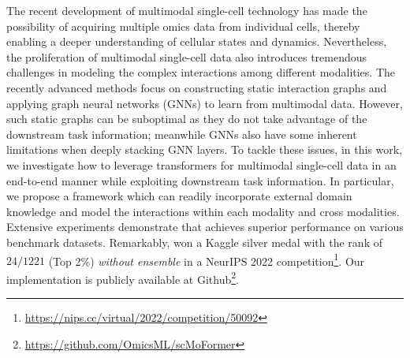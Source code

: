 The recent development of multimodal single-cell technology has made the possibility of acquiring multiple omics data from individual cells, thereby enabling a deeper understanding of cellular states and dynamics. 
Nevertheless, the proliferation of multimodal single-cell data also introduces tremendous challenges in modeling the complex interactions among different modalities. The recently advanced methods focus on constructing static interaction graphs and applying graph neural networks (GNNs) to learn from multimodal data. However, such static graphs can be suboptimal as they do not take advantage of the downstream task information; meanwhile GNNs also have some inherent limitations when deeply stacking GNN layers. To tackle these issues, in this work, we investigate how to leverage transformers for multimodal single-cell data in an end-to-end manner while exploiting downstream task information. In particular, we propose a \method{} framework which can readily incorporate external domain knowledge and model the interactions within each modality and cross modalities.
Extensive experiments demonstrate that \method{} achieves superior performance on various benchmark datasets. Remarkably, \method{} won a Kaggle silver medal with the rank of $24 / 1221$ (Top 2\%) {\it without ensemble} in a NeurIPS 2022 competition\footnote{\url{https://nips.cc/virtual/2022/competition/50092}}. Our implementation is publicly available at Github\footnote{\url{https://github.com/OmicsML/scMoFormer}}.











